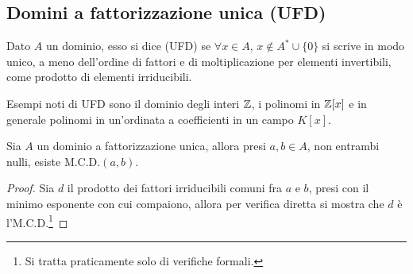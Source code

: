 \documentclass[11pt]{scrartcl}
\begin{document}
\newpage
\subsection{Domini a fattorizzazione unica (UFD)}
\begin{definition}
    Dato $A$ un dominio, esso si dice  (UFD) se $\forall x \in A$, $x \not\in A^* \cup \{0\}$ si scrive in modo
    unico, a meno dell'ordine di fattori e di moltiplicazione per elementi invertibili, come prodotto di elementi irriducibili.
\end{definition}

\begin{example}
    Esempi noti di UFD sono il dominio degli interi $\mathbb Z$, i polinomi in $\mathbb Z[x]$ e in generale polinomi in un'ordinata a coefficienti in un campo $K[x]$.
\end{example}

\begin{proposition}
    Sia $A$ un dominio a fattorizzazione unica, allora presi $a,b \in A$, non entrambi nulli, esiste $\text{M.C.D.}(a,b)$.
\end{proposition}

\begin{proof}
    Sia $d$ il prodotto dei fattori irriducibili comuni fra $a$ e $b$, presi con il minimo esponente con cui compaiono,
    allora per verifica diretta si mostra che $d$ è l'M.C.D.\footnote{Si tratta praticamente solo di verifiche formali.}
\end{proof}
\end{document}
